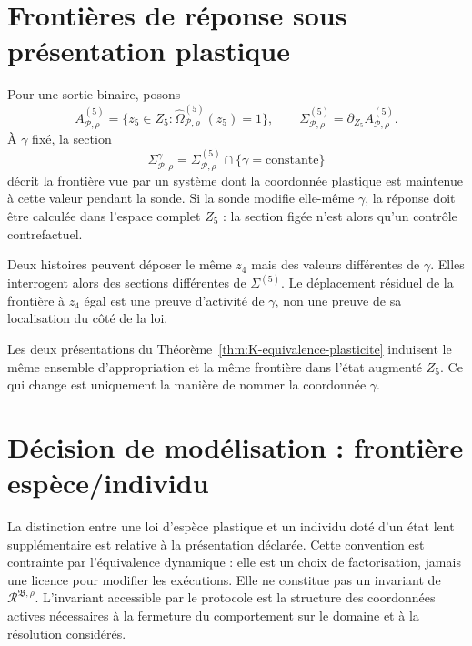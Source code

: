 \section{Frontières de réponse sous présentation plastique}
\label{annexe-K-frontieres}

Pour une sortie binaire, posons
\[
A^{(5)}_{\mathcal P,\rho}
=
\{z_5\in Z_5:\widehat\Omega^{(5)}_{\mathcal P,\rho}(z_5)=1\},
\qquad
\Sigma^{(5)}_{\mathcal P,\rho}
=
\partial_{Z_5}A^{(5)}_{\mathcal P,\rho}.
\]
À $\gamma$ fixé, la section
\[
\Sigma_{\mathcal P,\rho}^{\gamma}
=
\Sigma^{(5)}_{\mathcal P,\rho}
\cap\{\gamma=\mathrm{constante}\}
\]
décrit la frontière vue par un système dont la coordonnée plastique est
maintenue à cette valeur pendant la sonde. Si la sonde modifie elle-même
$\gamma$, la réponse doit être calculée dans l'espace complet $Z_5$ : la
section figée n'est alors qu'un contrôle contrefactuel.

Deux histoires peuvent déposer le même $z_4$ mais des valeurs différentes
de $\gamma$. Elles interrogent alors des sections différentes de
$\Sigma^{(5)}$. Le déplacement résiduel de la frontière à $z_4$ égal est
une preuve d'activité de $\gamma$, non une preuve de sa localisation du
côté de la loi.

\begin{encadre}[title={Corollaire \theproposition{} --- Invariance de la frontière complète}]
Les deux présentations du Théorème~\ref{thm:K-equivalence-plasticite} induisent le même ensemble
d'appropriation et la même frontière dans l'état augmenté $Z_5$. Ce qui
change est uniquement la manière de nommer la coordonnée $\gamma$.
\end{encadre}

\section{Décision de modélisation : frontière espèce/individu}
\label{annexe-K-espece-individu}

\begin{encadre}[title={D-08 --- Frontière déclarative}]
La distinction entre une loi d'espèce plastique et un individu doté
d'un état lent supplémentaire est relative à la présentation déclarée.
Cette convention est contrainte par l'équivalence dynamique : elle est un
choix de factorisation, jamais une licence pour modifier les exécutions.
Elle ne constitue pas un invariant de $\mathcal R^{\mathfrak B,\rho}$.
L'invariant accessible par le protocole est la structure des coordonnées
actives nécessaires à la fermeture du comportement sur le domaine et à
la résolution considérés.
\end{encadre}

